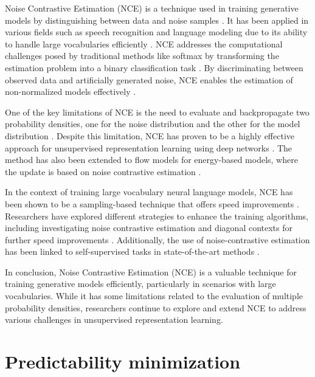 Noise Contrastive Estimation (NCE) is a technique used in training generative models by distinguishing between data and noise samples \citep{10.21437/interspeech.2016-1295}. It has been applied in various fields such as speech recognition and language modeling due to its ability to handle large vocabularies efficiently \citep{10.1609/aaai.v32i1.11967}. NCE addresses the computational challenges posed by traditional methods like softmax by transforming the estimation problem into a binary classification task \citep{10.18653/v1/e17-2003}. By discriminating between observed data and artificially generated noise, NCE enables the estimation of non-normalized models effectively \citep{10.48550/arxiv.1805.07516}.

One of the key limitations of NCE is the need to evaluate and backpropagate two probability densities, one for the noise distribution and the other for the model distribution \citep{10.18653/v1/e17-2003}. Despite this limitation, NCE has proven to be a highly effective approach for unsupervised representation learning using deep networks \citep{10.48550/arxiv.2205.01789}. The method has also been extended to flow models for energy-based models, where the update is based on noise contrastive estimation \citep{10.1109/cvpr42600.2020.00754}.

In the context of training large vocabulary neural language models, NCE has been shown to be a sampling-based technique that offers speed improvements \citep{10.18653/v1/p16-1186}. Researchers have explored different strategies to enhance the training algorithms, including investigating noise contrastive estimation and diagonal contexts for further speed improvements \citep{10.3115/v1/n15-1083}. Additionally, the use of noise-contrastive estimation has been linked to self-supervised tasks in state-of-the-art methods \citep{10.48550/arxiv.2203.01110}.

In conclusion, Noise Contrastive Estimation (NCE) is a valuable technique for training generative models efficiently, particularly in scenarios with large vocabularies. While it has some limitations related to the evaluation of multiple probability densities, researchers continue to explore and extend NCE to address various challenges in unsupervised representation learning.


\section*{Predictability minimization}


